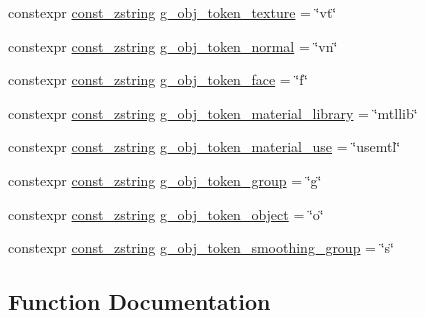 \begin{DoxyCompactItemize}
\item 
constexpr \mbox{\hyperlink{namespacemage_abfd9206dc607ceb5d13ec68bf075a5c0}{const\+\_\+zstring}} \mbox{\hyperlink{namespacemage_1_1rendering_1_1loader_a2f28917cef298bc975a0a9b5ceecfb34}{g\+\_\+obj\+\_\+token\+\_\+texture}} = \char`\"{}vt\char`\"{}
\item 
constexpr \mbox{\hyperlink{namespacemage_abfd9206dc607ceb5d13ec68bf075a5c0}{const\+\_\+zstring}} \mbox{\hyperlink{namespacemage_1_1rendering_1_1loader_a1ccd473a1d57fa2581197b20131a7e98}{g\+\_\+obj\+\_\+token\+\_\+normal}} = \char`\"{}vn\char`\"{}
\item 
constexpr \mbox{\hyperlink{namespacemage_abfd9206dc607ceb5d13ec68bf075a5c0}{const\+\_\+zstring}} \mbox{\hyperlink{namespacemage_1_1rendering_1_1loader_ac729da300a11d2af468702b4fd8c17a0}{g\+\_\+obj\+\_\+token\+\_\+face}} = \char`\"{}f\char`\"{}
\item 
constexpr \mbox{\hyperlink{namespacemage_abfd9206dc607ceb5d13ec68bf075a5c0}{const\+\_\+zstring}} \mbox{\hyperlink{namespacemage_1_1rendering_1_1loader_adeb966ab9cb13f0665a23d31d34fc85b}{g\+\_\+obj\+\_\+token\+\_\+material\+\_\+library}} = \char`\"{}mtllib\char`\"{}
\item 
constexpr \mbox{\hyperlink{namespacemage_abfd9206dc607ceb5d13ec68bf075a5c0}{const\+\_\+zstring}} \mbox{\hyperlink{namespacemage_1_1rendering_1_1loader_aca66c986fe0debd4ea787ff4464fbb72}{g\+\_\+obj\+\_\+token\+\_\+material\+\_\+use}} = \char`\"{}usemtl\char`\"{}
\item 
constexpr \mbox{\hyperlink{namespacemage_abfd9206dc607ceb5d13ec68bf075a5c0}{const\+\_\+zstring}} \mbox{\hyperlink{namespacemage_1_1rendering_1_1loader_a71c11c96ce588a1bc2dda43c4b0711c1}{g\+\_\+obj\+\_\+token\+\_\+group}} = \char`\"{}g\char`\"{}
\item 
constexpr \mbox{\hyperlink{namespacemage_abfd9206dc607ceb5d13ec68bf075a5c0}{const\+\_\+zstring}} \mbox{\hyperlink{namespacemage_1_1rendering_1_1loader_a8127f2d8ffe798289f55d789c317ef19}{g\+\_\+obj\+\_\+token\+\_\+object}} = \char`\"{}o\char`\"{}
\item 
constexpr \mbox{\hyperlink{namespacemage_abfd9206dc607ceb5d13ec68bf075a5c0}{const\+\_\+zstring}} \mbox{\hyperlink{namespacemage_1_1rendering_1_1loader_aa21b49ead7809938e24c738c71f408c0}{g\+\_\+obj\+\_\+token\+\_\+smoothing\+\_\+group}} = \char`\"{}s\char`\"{}
\end{DoxyCompactItemize}


\subsection{Function Documentation}
\mbox{\label{namespacemage_1_1rendering_1_1loader_a32ddddf4a3e11604675f31c1cf901ad1}} 
